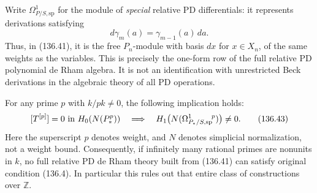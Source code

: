 Write $\Omega^1_{P/S,\mathrm{sp}}$ for the module of
\emph{special} relative PD differentials: it represents
derivations satisfying
\[
                   d\gamma_m(a)=\gamma_{m-1}(a)\,da.
                                                               \tag{136.42}
\]
Thus, in (136.41), it is the free $P_n$-module with
basis $dx$ for $x\in X_n$, of the same weights as
the variables.  This is precisely the one-form row
of the full relative PD polynomial de Rham algebra.
It is not an identification with unrestricted Beck
derivations in the algebraic theory of all PD operations.

For any prime $p$ with $k/pk\ne0$, the following
implication holds:
\[
 [T^{[p]}]=0\ \hbox{in }H_0(N(P_*^p))
 \quad\Longrightarrow\quad
 H_1\bigl(N(\Omega^1_{P_*/S,\mathrm{sp}}{}^{\!p})\bigr)
                                  \ne0.                    \tag{136.43}
\]
Here the superscript $p$ denotes weight, and $N$
denotes simplicial normalization, not a weight bound.
Consequently, if infinitely many rational primes
are nonunits in $k$, no full relative PD de Rham
theory built from (136.41) can satisfy original
condition (136.4).  In particular this rules out
that entire class of constructions over $\mathbb Z$.

